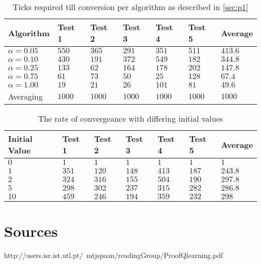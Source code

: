 \documentclass[12pt]{article}
\begin{document}
\begin{table}[]
\centering
\begin{tabular}{|l|l|l|l|l|l|l|}
\hline
Algorithm       & Test 1                   & Test 2 & Test 3 & Test 4 & Test 5 & Average  \\ \hline
$\alpha = 0.05$ & $550$         & $365$    & $291$    & $351$    & $511$    & $413.6$ 		\\ \hline
$\alpha = 0.10$ & $430$ 				& $191$    & $372$    & $549$    & $182$    & $344.8$ 		\\ \hline
$\alpha = 0.25$ & $133$         & $62$     & $164$    & $178$    & $202$    & $147.8$ 		\\ \hline
$\alpha = 0.75$ & $61$          & $73$     & $50$     & $25$     & $128$    & $67.4$      \\ \hline
$\alpha = 1.00$ & $19$          & $21$     & $26$     & $101$    & $81$     & $49.6$      \\ \hline
Averaging       & $1000$        & $1000$   & $1000$   & $1000$   & $1000$   & $1000$      \\ \hline
\end{tabular}
\caption{Ticks required till conversion per algorithm as described in \ref{sec:p1} }
\label{table:P1-comparisson}
\end{table}


\begin{table}[]
\centering
\begin{tabular}{|l|l|l|l|l|l|l|}
\hline
Initial Value & Test 1 & Test 2 & Test 3 & Test 4 & Test 5 & Average \\ \hline
$0$       & $1$      & $1$      & $1$      & $1$      & $1$      & $1$       \\ \hline
$1$       & $351$    & $120$    & $148$    & $413$    & $187$    & $243.8$   \\ \hline
$2$       & $324$    & $316$    & $155$    & $504$    & $190$    & $297.8$   \\ \hline
$5$       & $298$    & $302$    & $237$    & $315$    & $282$    & $286.8$   \\ \hline
$10$      & $459$    & $246$    & $194$    & $359$    & $232$    & $298$     \\ \hline
\end{tabular}
\caption{The rate of convergeance with differing initial values}
\label{my-label}
\end{table}

\section{Sources}
http://users.isr.ist.utl.pt/~mtjspaan/readingGroup/ProofQlearning.pdf
\end{document}
